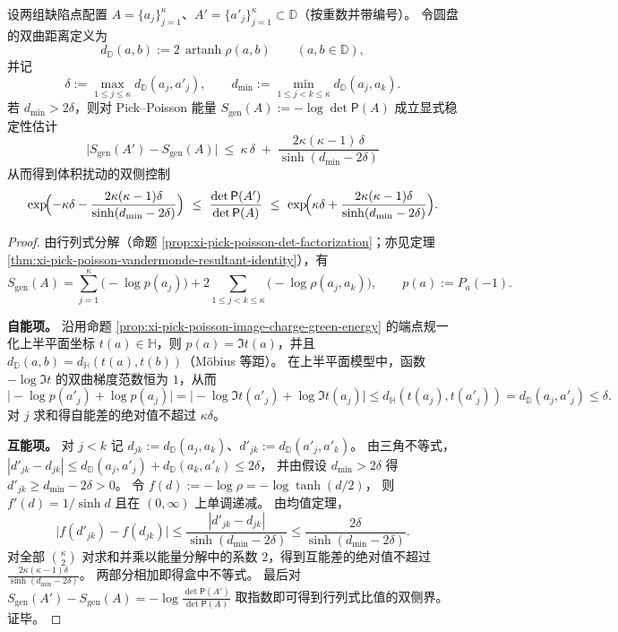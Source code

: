 \begin{theorem}\label{thm:xi-pick-poisson-energy-stability-away-from-collision}
设两组缺陷点配置 \(A=\{a_j\}_{j=1}^{\kappa}\)、\(A'=\{a'_j\}_{j=1}^{\kappa}\subset\mathbb D\)（按重数并带编号）。
令圆盘的双曲距离定义为
\[
d_{\mathbb D}(a,b):=2\,\operatorname{artanh}\rho(a,b)\qquad(a,b\in\mathbb D),
\]
并记
\[
\delta:=\max_{1\le j\le\kappa} d_{\mathbb D}(a_j,a'_j),
\qquad
d_{\min}:=\min_{1\le j<k\le\kappa} d_{\mathbb D}(a_j,a_k).
\]
若 \(d_{\min}>2\delta\)，则对 Pick--Poisson 能量
\(
S_{\mathrm{gen}}(A):=-\log\det\mathsf P(A)
\)
成立显式稳定性估计
\[
\boxed{\;
\bigl|S_{\mathrm{gen}}(A')-S_{\mathrm{gen}}(A)\bigr|
\ \le\
\kappa\,\delta
\;+\;
\frac{2\kappa(\kappa-1)\,\delta}{\sinh(d_{\min}-2\delta)}\;}
\]
从而得到体积扰动的双侧控制
\[
\exp\!\Bigl(-\kappa\delta-\frac{2\kappa(\kappa-1)\delta}{\sinh(d_{\min}-2\delta)}\Bigr)
\ \le\
\frac{\det\mathsf P(A')}{\det\mathsf P(A)}
\ \le\
\exp\!\Bigl(\kappa\delta+\frac{2\kappa(\kappa-1)\delta}{\sinh(d_{\min}-2\delta)}\Bigr).
\]
\end{theorem}
\begin{proof}
由行列式分解（命题 \ref{prop:xi-pick-poisson-det-factorization}；亦见定理 \ref{thm:xi-pick-poisson-vandermonde-resultant-identity}），有
\[
S_{\mathrm{gen}}(A)
=\sum_{j=1}^{\kappa}\bigl(-\log p(a_j)\bigr)
+2\sum_{1\le j<k\le\kappa}\bigl(-\log\rho(a_j,a_k)\bigr),
\qquad p(a):=P_a(-1).
\]
\par
\textbf{自能项。}
沿用命题 \ref{prop:xi-pick-poisson-image-charge-green-energy} 的端点规一化上半平面坐标 \(t(a)\in\mathbb H\)，则 \(p(a)=\Im t(a)\)，并且 \(d_{\mathbb D}(a,b)=d_{\mathbb H}(t(a),t(b))\)（M\"obius 等距）。
在上半平面模型中，函数 \(-\log\Im t\) 的双曲梯度范数恒为 \(1\)，从而
\[
\bigl|-\log p(a'_j)+\log p(a_j)\bigr|
=\bigl|-\log\Im t(a'_j)+\log\Im t(a_j)\bigr|
\le d_{\mathbb H}(t(a_j),t(a'_j))
=d_{\mathbb D}(a_j,a'_j)
\le \delta.
\]
对 \(j\) 求和得自能差的绝对值不超过 \(\kappa\delta\)。
\par
\textbf{互能项。}
对 \(j<k\) 记 \(d_{jk}:=d_{\mathbb D}(a_j,a_k)\)、\(d'_{jk}:=d_{\mathbb D}(a'_j,a'_k)\)。
由三角不等式，
\(
|d'_{jk}-d_{jk}|\le d_{\mathbb D}(a_j,a'_j)+d_{\mathbb D}(a_k,a'_k)\le 2\delta
\)，
并由假设 \(d_{\min}>2\delta\) 得 \(d'_{jk}\ge d_{\min}-2\delta>0\)。
令
\(
f(d):=-\log\rho=-\log\tanh(d/2)
\)，
则
\(
f'(d)=1/\sinh d
\)
且在 \((0,\infty)\) 上单调递减。
由均值定理，
\[
\bigl|f(d'_{jk})-f(d_{jk})\bigr|
\le \frac{|d'_{jk}-d_{jk}|}{\sinh(d_{\min}-2\delta)}
\le \frac{2\delta}{\sinh(d_{\min}-2\delta)}.
\]
对全部 \(\binom{\kappa}{2}\) 对求和并乘以能量分解中的系数 \(2\)，得到互能差的绝对值不超过
\(
\frac{2\kappa(\kappa-1)\delta}{\sinh(d_{\min}-2\delta)}
\)。
两部分相加即得盒中不等式。
最后对
\(
S_{\mathrm{gen}}(A')-S_{\mathrm{gen}}(A)=-\log\frac{\det\mathsf P(A')}{\det\mathsf P(A)}
\)
取指数即可得到行列式比值的双侧界。证毕。
\end{proof}

\endinput
